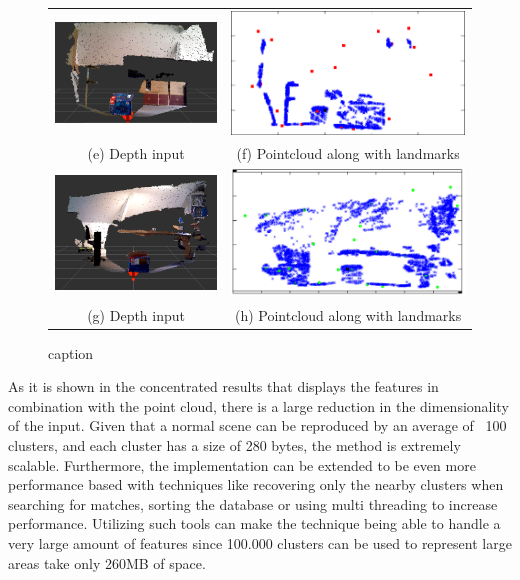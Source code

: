 \documentclass[twoside,hidelinks]{article}
\begin{document}
\begin{figure}
\begin{tabular}{cc}
	\includegraphics[width=60mm]{box/input3} & 
  \includegraphics[width=85mm]{box/clusters3} \\
(e) Depth input & (f) Pointcloud along with landmarks \\[6pt]
	\includegraphics[width=60mm]{box/input4} & 
  \includegraphics[width=85mm]{box/clusters4} \\
(g) Depth input & (h) Pointcloud along with landmarks \\[6pt]
\end{tabular}
\caption{caption}
\end{figure}


As it is shown in the concentrated results that displays the features in combination with the point cloud, there is a large reduction in the dimensionality of the input. Given that a normal scene can be reproduced by an average of ~100 clusters, and each cluster has a size of 280 bytes, the method is extremely scalable. Furthermore, the implementation can be extended to be even more performance based with techniques like recovering only the nearby clusters when searching for matches, sorting the database or using multi threading to increase performance. Utilizing such tools can make the technique being able to handle a very large amount of features since 100.000 clusters can be used to represent large areas take only 260MB of space.
\end{document}
